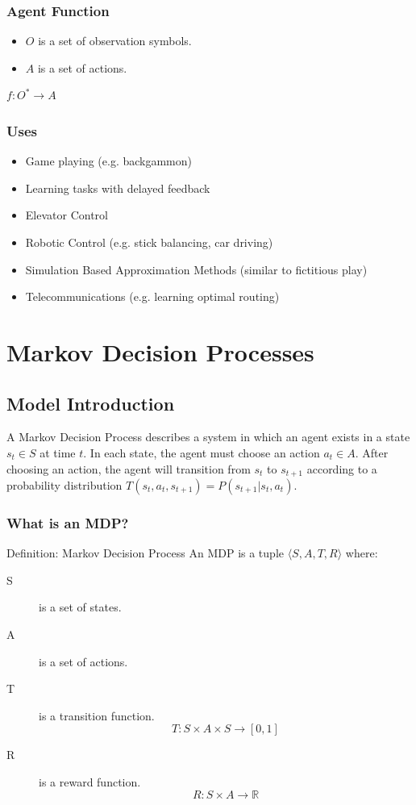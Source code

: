 \documentclass[ignorenonframetext]{beamer}
\begin{document}
\begin{frame}
	\frametitle{Agent Function}
	\begin{itemize}
		\item $O$ is a set of observation symbols.
		\item $A$ is a set of actions.
	\end{itemize}
	\begin{block}{}
		\begin{center}
			$f: O^* \rightarrow A $
		\end{center}
	\end{block}
\end{frame}

\begin{frame}
	\frametitle{Uses}
	\begin{itemize}
		\item Game playing (e.g. backgammon)
		\item Learning tasks with delayed feedback
		\item Elevator Control
		\item Robotic Control (e.g. stick balancing, car driving)
		\item Simulation Based Approximation Methods (similar to
			fictitious play)
		\item Telecommunications (e.g. learning optimal
			routing)
	\end{itemize}
\end{frame}

\section{Markov Decision Processes}

\subsection{Model Introduction}

A Markov Decision Process describes a system in which an agent exists
in a state $s_t \in S$ at time $t$.  In each state, the agent must choose
an action $a_t \in A$.  After choosing an action, the agent will
transition from $s_t$ to $s_{t+1}$ according to a probability
distribution $T(s_t, a_t, s_{t+1}) = P(s_{t+1} | s_t, a_t)$.

\begin{frame}
	\frametitle{What is an MDP?}
	\begin{block}{Definition: Markov Decision Process}
		An MDP is a tuple $\langle S, A, T, R \rangle$ where:
		\begin{description}
			\item[S] is a set of states.
			\item[A] is a set of actions.
			\item[T] is a transition function. 
				\[ T: S\times A\times S \rightarrow [0,1] \]
			\item[R] is a reward function. 
				\[ R: S\times A \rightarrow \mathbb{R} \] 
		\end{description}
	\end{block}
\end{frame}
\end{document}
